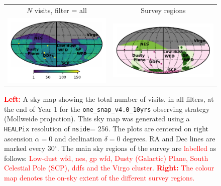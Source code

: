 \documentclass[preprintm,linenumbers]{aastex631}
\newcommand{\baselinefull}{\texttt{one\_snap\_v4.0\_10yrs}\xspace}
\newcommand{\nside}{\texttt{nside}\xspace}
\newcommand{\healpix}{\texttt{HEALPix}\xspace} %
\providecommand{\red}[1]{\textcolor{red}{#1}}
\begin{document}
		\begin{figure}
  	\centering
\begin{tabular}{@{}c@{}c@{}}
	$N$ visits, filter = all &
	Survey regions\\
	\includegraphics[align=t]{results/skymaps/skymap_first_year_one_snap_v4_0_10yrs_nside-256_CountMetric_all_noDD_noTwi.pdf} &
	\includegraphics[align=t]{results/skymaps/skymap_first_year_one_snap_v4_0_10yrs_nside-256_CountMetric_all_noDD_noTwi_bounds.pdf} \\
\end{tabular}
				\caption{\red{\textbf{Left:}} A sky map showing the total number of visits, in all filters, at the end of Year 1 for the \baselinefull observing strategy (Mollweide projection). 
    This sky map was generated using a \healpix \citep[Hierarchical Equal Area isoLatitude Pixelization; ][]{2005ApJ...622..759G}  resolution of \nside = 256.
    The plots are centered on right ascension $\alpha = 0$ and declination $\delta = 0$ degrees. RA and Dec lines are marked every 30$^\circ$.
    The main sky regions of the survey are \red{labelled} as follows: \red{Low-dust \gls*{wfd}, \gls*{nes}, \glsreset{gp}\gls*{gp} \gls*{wfd}, Dusty (Galactic) Plane, South Celestial Pole (SCP), \glsreset{ddf}\glspl*{ddf} and the Virgo cluster.}
    \red{\textbf{Right:} The colour map denotes the on-sky extent of the different survey regions.}
    }
    \label{fig:baseline_labels}
		\end{figure}
\end{document}
